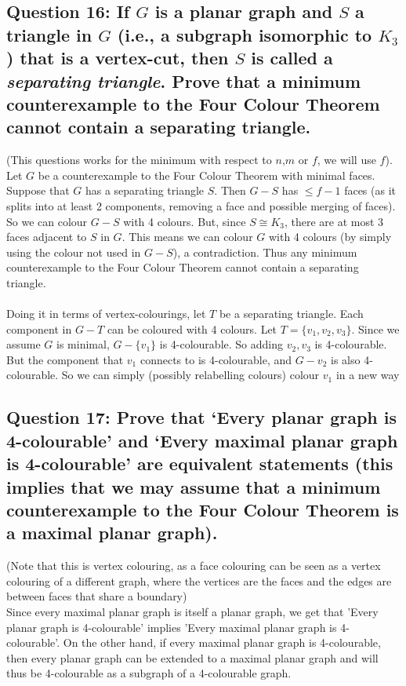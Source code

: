 \documentclass[letterpaper, 11pt]{article}
\newcommand{\1}{\mathds{1}}	%
\theoremstyle{definition}
\begin{document}
\subsection*{Question 16: If $G$ is a planar graph and $S$ a triangle in $G$ (i.e., a subgraph isomorphic to $K_3$)
that is a vertex-cut, then $S$ is called a \textit{separating triangle}. Prove that a minimum
counterexample to the Four Colour Theorem cannot contain a separating triangle.}
(This questions works for the minimum with respect to $n$,$m$ or $f$, we will use $f$). Let $G$ be a counterexample to the Four Colour Theorem with minimal faces. Suppose that $G$ has a separating triangle $S$. Then $G - S$ has $\le f-1$ faces (as it splits into at least 2 components, removing a face and possible merging of faces). So we can colour $G-S$ with 4 colours.  But, since $S \cong K_3$, there are at most 3 faces adjacent to $S$ in $G$. This means we can colour $G$ with 4 colours (by simply using the colour not used in $G-S$), a contradiction. Thus any minimum counterexample to the Four Colour Theorem cannot contain a separating triangle.
~\\~\\ Doing it in terms of vertex-colourings, let $T$ be a separating triangle. Each component in $G - T$ can be coloured with 4 colours. Let $T = \{v_1,v_2,v_3\}$. Since we assume $G$ is minimal, $G - \{v_1\}$ is 4-colourable. So adding $v_2,v_3$ is 4-colourable. But the component that $v_1$ connects to is 4-colourable, and $G - v_2$ is also 4-colourable. So we can simply (possibly relabelling colours) colour $v_1$ in a new way
\subsection*{Question 17: Prove that ‘Every planar graph is 4-colourable’ and ‘Every maximal planar graph
is 4-colourable’ are equivalent statements (this implies that we may assume that a
minimum counterexample to the Four Colour Theorem is a maximal planar graph).}
(Note that this is vertex colouring, as a face colouring can be seen as a vertex colouring of a different graph, where the vertices are the faces and the edges are between faces that share a boundary)~\\
Since every maximal planar graph is itself a planar graph, we get that 'Every planar graph is 4-colourable' implies 'Every maximal planar graph is 4-colourable'. On the other hand, if every maximal planar graph is 4-colourable, then every planar graph can be extended to a maximal planar graph and will thus be 4-colourable as a subgraph of a 4-colourable graph.
\end{document}
